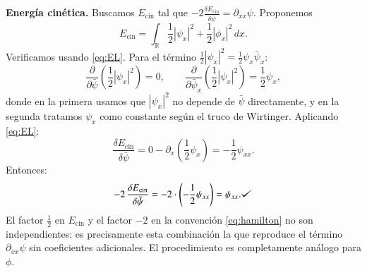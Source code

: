 \documentclass[letterpaper,11pt]{exam}
\def\checkmark{\tikz\fill[scale=0.4](0,.35) -- (.25,0) -- (1,.7) -- (.25,.15) -- cycle;}
\theoremstyle{plain}
\begin{document}
\medskip
\noindent\textbf{Energía cinética.}
Buscamos $E_{\mathrm{cin}}$ tal que $-2\frac{\delta E_{\mathrm{cin}}}{\delta\bar{\psi}} = \partial_{xx}\psi$.
Proponemos
\begin{equation}
    E_{\mathrm{cin}} = \int_{\mathbb{R}} \frac{1}{2}|\psi_x|^2 + \frac{1}{2}|\phi_x|^2\,dx.
\end{equation}
Verificamos usando \eqref{eq:EL}. Para el término $\frac{1}{2}|\psi_x|^2 = \frac{1}{2}\psi_x\bar{\psi}_x$:
\begin{equation}
    \frac{\partial}{\partial\bar{\psi}}\!\left(\frac{1}{2}|\psi_x|^2\right) = 0, \qquad
    \frac{\partial}{\partial\bar{\psi}_x}\!\left(\frac{1}{2}|\psi_x|^2\right) = \frac{1}{2}\psi_x,
\end{equation}
donde en la primera usamos que $|\psi_x|^2$ no depende de $\bar{\psi}$ directamente,
y en la segunda tratamos $\psi_x$ como constante según el truco de Wirtinger.
Aplicando \eqref{eq:EL}:
\begin{equation}
    \frac{\delta E_{\mathrm{cin}}}{\delta\bar{\psi}}
    = 0 - \partial_x\!\left(\frac{1}{2}\psi_x\right) = -\frac{1}{2}\psi_{xx}.
\end{equation}
Entonces:
\begin{equation}
    -2\,\frac{\delta E_{\mathrm{cin}}}{\delta\bar{\psi}} = -2\cdot\left(-\frac{1}{2}\psi_{xx}\right) = \psi_{xx}. \checkmark
\end{equation}
El factor $\frac{1}{2}$ en $E_{\mathrm{cin}}$ y el factor $-2$ en la convención
\eqref{eq:hamilton} no son independientes: es precisamente esta combinación la que
reproduce el término $\partial_{xx}\psi$ sin coeficientes adicionales. El procedimiento
es completamente análogo para $\phi$.

\medskip
\end{document}
